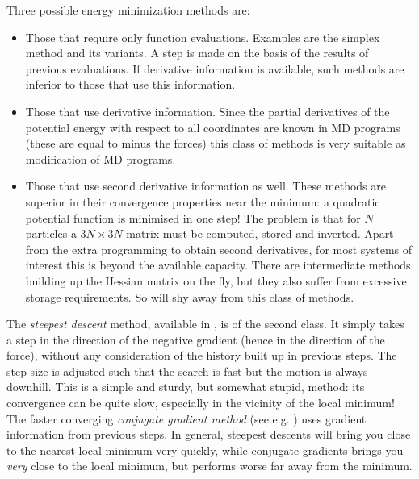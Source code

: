 Three possible energy minimization methods are:
\begin{itemize}
\item 	Those that require only function evaluations. Examples are the 
	simplex method and its variants. A step is made on the basis of the 
	results of previous evaluations. If derivative information is 
	available, such methods are inferior to those that use 
	this information.
\item 	Those that use derivative information. Since the partial 
	derivatives of the potential energy with respect to all 
	coordinates are known in MD programs (these are equal to minus 
	the forces) this class of methods is very suitable as modification 
	of MD programs.
\item 	Those that use second derivative information as well. These methods 
	are superior in their convergence properties near the minimum: a 
	quadratic potential function is minimised in one step! The problem 
	is that for $N$ particles a $3N\times 3N$ matrix must be computed, 
	stored and inverted. Apart from the extra programming to obtain 
	second derivatives, for most systems of interest this is beyond the 
	available capacity. There are intermediate methods building up the 
	Hessian matrix on the fly, but they also suffer from excessive 
	storage requirements. So {\gromacs} will shy away from this class 
	of methods.
\end{itemize}


The {\em steepest descent} method, available in {\gromacs}, is of the
second class. It simply takes a step in the direction of the negative
gradient (hence in the direction of the force), without any
consideration of the history built up in previous steps. The step size
is adjusted such that the search is fast but the motion is always
downhill. This is a simple and sturdy, but somewhat stupid, method:
its convergence can be quite slow, especially in the vicinity of the
local minimum! The faster converging {\em conjugate gradient method}
(see e.g. \cite{Zimmerman91}) uses gradient information from previous
steps. In general, steepest descents will bring you close to the
nearest local minimum very quickly, while conjugate gradients brings
you {\em very} close to the local minimum, but performs worse far away
from the minimum.
